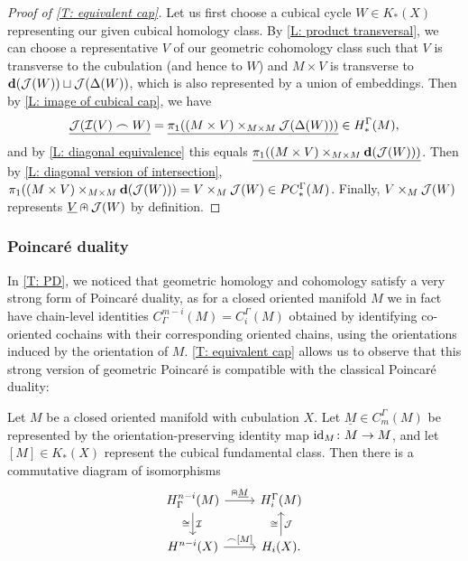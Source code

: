 \begin{proof}[Proof of \cref{T: equivalent cap}]
	Let us first choose a cubical cycle $W \in K_*(X)$ representing our given cubical homology class.
	By \cref{L: product transversal}, we can choose a representative $V$ of our geometric cohomology class such that $V$ is transverse to the cubulation (and hence to $W$) and $M \times V$ is transverse to $\mathbf{d}(\mathcal{J}(W)) \sqcup \mathcal{J}(\Delta(W))$, which is also represented by a union of embeddings.
	Then by \cref{L: image of cubical cap}, we have
	$$\underline{\mathcal{J}(\mathcal{I}(V)\frown W)} = \underline{\pi_1( (M \times V)\times_{M \times M}\mathcal{J}(\Delta(W)))} \in H_*^\Gamma(M),$$
	and by \cref{L: diagonal equivalence} this equals $\underline{\pi_1((M \times V)\times_{M \times M} \mathbf{d}(\mathcal{J}(W)))}$.
	Then by \cref{L: diagonal version of intersection},
	$\pi_1((M \times V)\times_{M \times M} \mathbf{d}(\mathcal{J}(W))) = V \times_M \mathcal{J}(W) \in PC_*^\Gamma(M)$.
	Finally, $V \times_M \mathcal{J}(W)$ represents $\underline{V}\nplus \mathcal{J}(W)$ by definition.
\end{proof}

\subsubsection{Poincar\'e duality}\label{S: PD}

In \cref{T: PD}, we noticed that geometric homology and cohomology satisfy a very strong form of Poincar\'e duality, as for a closed oriented manifold $M$ we in fact have chain-level identities $C^{m-i}_\Gamma(M) = C_i^\Gamma(M)$ obtained by identifying co-oriented cochains with their corresponding oriented chains, using the orientations induced by the orientation of $M$.
\cref{T: equivalent cap} allows us to observe that this strong version of geometric Poincar\'e is compatible with the classical Poincar\'e duality:

\begin{corollary}\label{C: PD}
	Let $M$ be a closed oriented manifold with cubulation $X$.
	Let $\underline M \in C_m^\Gamma(M)$ be represented by the orientation-preserving identity map $\mathrm{id}_M \colon M \to M$, and let $[M] \in K_*(X)$ represent the cubical fundamental class.
	Then there is a commutative diagram of isomorphisms
	\[
	\begin{tikzcd}
		H^{n-i}_\Gamma(M) \arrow{r}{\nplus \uM} \arrow[d, "\mc I","\cong"'] & H_i^\Gamma(M) \\
		H^{n-i}(X) \arrow{r}{\frown [M]} & H_i(X). \arrow[u, "\mc J"',,"\cong"]
	\end{tikzcd}
	\]
\end{corollary}


